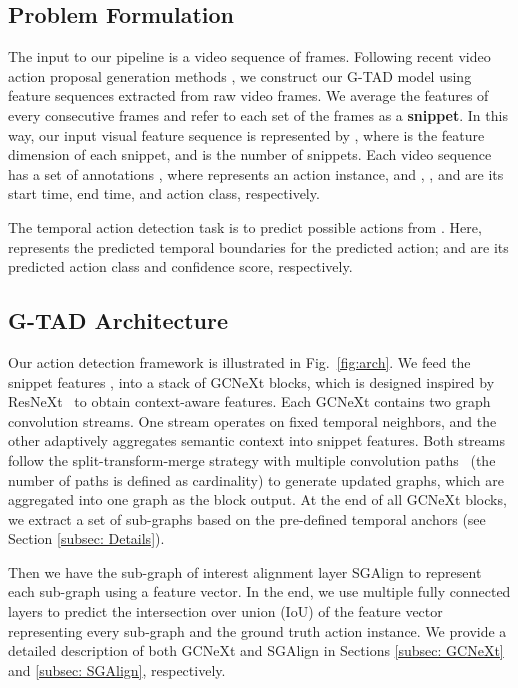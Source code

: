 \documentclass[10pt,twocolumn,letterpaper]{article}
\begin{document}
\subsection{Problem Formulation}
The input to our pipeline is a video sequence of   frames.
Following recent video action proposal generation methods \cite{buch2017sst, escorcia2016daps, gao2017turn,lin2018bsn}, we construct our G-TAD model using feature sequences extracted from raw video frames. 
We average the features of every  consecutive frames and refer to each set of the  frames as a  \textbf{snippet}.
In this way, our input visual feature sequence is represented by
, 
where  is the feature dimension of each snippet, and  is the number of snippets. Each video sequence has a set of  annotations
, where  represents an action instance, and , , and  are its start time, end time, and action class, respectively.


The temporal action detection task is to predict  possible actions  from  . Here,  represents the predicted temporal boundaries for the  predicted action;  and  are its predicted action class and confidence score, respectively.


\subsection{G-TAD Architecture}

Our action detection framework is illustrated in Fig.~\ref{fig:arch}. 
We feed the snippet features , into a stack of  GCNeXt blocks, which is designed inspired by ResNeXt~\cite{xie2017aggregated} to obtain context-aware features. Each GCNeXt contains two graph convolution streams. One stream operates on fixed temporal neighbors, and the other adaptively aggregates semantic context into snippet features. Both streams follow the split-transform-merge strategy with multiple convolution paths~\cite{xie2017aggregated} (the number of paths is defined as cardinality) to generate updated graphs, which are aggregated into one graph as the block output.
At the end of all  GCNeXt blocks, we extract a set of sub-graphs based on the pre-defined temporal anchors (see Section \ref{subsec: Details}). 

Then we have the sub-graph of interest alignment layer SGAlign to represent each sub-graph
using a feature vector.
In the end, we use multiple fully connected layers to predict the intersection over union (IoU) of the feature vector representing every sub-graph and the ground truth action instance. We provide a detailed description of both GCNeXt and SGAlign 
in Sections \ref{subsec: GCNeXt} and \ref{subsec: SGAlign}, respectively.
\end{document}
